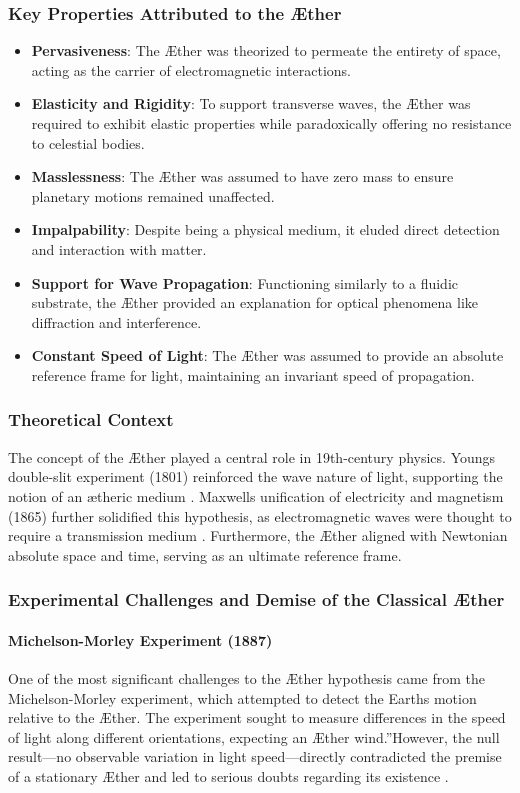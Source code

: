     \subsubsection*{Key Properties Attributed to the Æther}
    \begin{itemize}
        \item \textbf{Pervasiveness}: The Æther was theorized to permeate the entirety of space, acting as the carrier of electromagnetic interactions.
        \item \textbf{Elasticity and Rigidity}: To support transverse waves, the Æther was required to exhibit elastic properties while paradoxically offering no resistance to celestial bodies.
        \item \textbf{Masslessness}: The Æther was assumed to have zero mass to ensure planetary motions remained unaffected.
        \item \textbf{Impalpability}: Despite being a physical medium, it eluded direct detection and interaction with matter.
        \item \textbf{Support for Wave Propagation}: Functioning similarly to a fluidic substrate, the Æther provided an explanation for optical phenomena like diffraction and interference.
        \item \textbf{Constant Speed of Light}: The Æther was assumed to provide an absolute reference frame for light, maintaining an invariant speed of propagation.
    \end{itemize}

    \subsubsection*{Theoretical Context}
    The concept of the Æther played a central role in 19th-century physics. Young\rqs s double-slit experiment (1801) reinforced the wave nature of light, supporting the notion of an ætheric medium \cite{young1801}. Maxwell\rqs s unification of electricity and magnetism (1865) further solidified this hypothesis, as electromagnetic waves were thought to require a transmission medium \cite{maxwell1865}. Furthermore, the Æther aligned with Newtonian absolute space and time, serving as an ultimate reference frame.

    \subsubsection*{Experimental Challenges and Demise of the Classical Æther}
    \paragraph*{Michelson-Morley Experiment (1887)}
    One of the most significant challenges to the Æther hypothesis came from the Michelson-Morley experiment, which attempted to detect the Earth\rqs s motion relative to the Æther. The experiment sought to measure differences in the speed of light along different orientations, expecting an \grqq Æther wind.\textquotedblright However, the null result—no observable variation in light speed—directly contradicted the premise of a stationary Æther and led to serious doubts regarding its existence \cite{michelson1887}.

